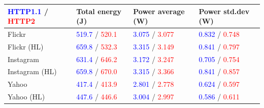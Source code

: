 \documentclass[noback]{cuposter}
\begin{document}
\begin{tabular}{|l|K{8cm}|K{8.1cm}|K{8cm}|}
    \hline
    \textcolor{blue}{HTTP1.1} / \textcolor{red}{HTTP2} & Total energy (J) & Power average (W) & Power std.dev (W) \\ \hline \hline
    Flickr & \textcolor{blue}{519.7} / \textcolor{red}{520.1}  &\textcolor{blue}{3.075} / \textcolor{red}{3.077}  &
    \textcolor{blue}{0.832} / \textcolor{red}{0.748}  \\ \hline
    Flickr (HL) & \textcolor{blue}{659.8} / \textcolor{red}{532.3}  &\textcolor{blue}{3.315} / \textcolor{red}{3.149}  &
    \textcolor{blue}{0.841} / \textcolor{red}{0.797}  \\ \hline \hline

    Instagram & \textcolor{blue}{631.4} / \textcolor{red}{646.2} & \textcolor{blue}{3.172} / \textcolor{red}{3.247} & \textcolor{blue}{0.705} / \textcolor{red}{0.754} \\ \hline

    Instagram (HL) & \textcolor{blue}{659.8} / \textcolor{red}{670.0} & \textcolor{blue}{3.315} / \textcolor{red}{3.366} & \textcolor{blue}{0.841} / \textcolor{red}{0.857} \\ \hline \hline

    Yahoo & \textcolor{blue}{417.4} / \textcolor{red}{413.9} &\textcolor{blue}{2.801} / \textcolor{red}{2.778}  & \textcolor{blue}{0.624} / \textcolor{red}{0.597}  \\ \hline
    Yahoo (HL) & \textcolor{blue}{447.6} / \textcolor{red}{446.6} &\textcolor{blue}{3.004} / \textcolor{red}{2.997}  & \textcolor{blue}{0.586} / \textcolor{red}{0.611}  \\ \hline
\end{tabular}
\vspace{-2mm}
\end{document}
